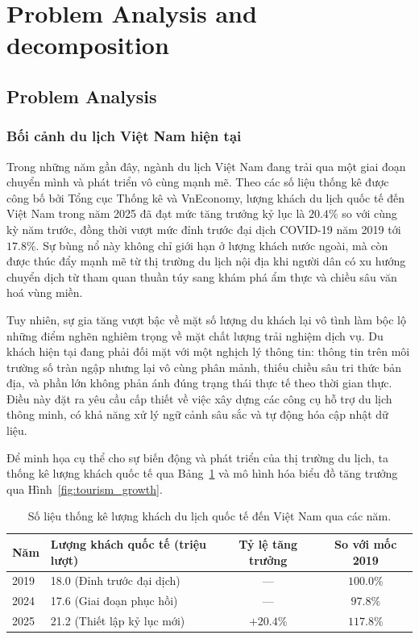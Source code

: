\section{Problem Analysis and decomposition}

\subsection{Problem Analysis}

\subsubsection{Bối cảnh du lịch Việt Nam hiện tại}

Trong những năm gần đây, ngành du lịch Việt Nam đang trải qua một giai đoạn chuyển mình và phát triển vô cùng mạnh mẽ. Theo các số liệu thống kê được công bố bởi Tổng cục Thống kê và VnEconomy, lượng khách du lịch quốc tế đến Việt Nam trong năm 2025 đã đạt mức tăng trưởng kỷ lục là $20.4\%$ so với cùng kỳ năm trước, đồng thời vượt mức đỉnh trước đại dịch COVID-19 năm 2019 tới $17.8\%$. Sự bùng nổ này không chỉ giới hạn ở lượng khách nước ngoài, mà còn được thúc đẩy mạnh mẽ từ thị trường du lịch nội địa khi người dân có xu hướng chuyển dịch từ tham quan thuần túy sang khám phá ẩm thực và chiều sâu văn hoá vùng miền.

Tuy nhiên, sự gia tăng vượt bậc về mặt số lượng du khách lại vô tình làm bộc lộ những điểm nghẽn nghiêm trọng về mặt chất lượng trải nghiệm dịch vụ. Du khách hiện tại đang phải đối mặt với một nghịch lý thông tin: thông tin trên môi trường số tràn ngập nhưng lại vô cùng phân mảnh, thiếu chiều sâu tri thức bản địa, và phần lớn không phản ánh đúng trạng thái thực tế theo thời gian thực. Điều này đặt ra yêu cầu cấp thiết về việc xây dựng các công cụ hỗ trợ du lịch thông minh, có khả năng xử lý ngữ cảnh sâu sắc và tự động hóa cập nhật dữ liệu.

Để minh họa cụ thể cho sự biến động và phát triển của thị trường du lịch, ta thống kê lượng khách quốc tế qua Bảng~\ref{tab:tourism_stats} và mô hình hóa biểu đồ tăng trưởng qua Hình~\ref{fig:tourism_growth}.

\begin{table}[H]
\centering
\begin{tabularx}{\textwidth}{l X c c}
\toprule
\textbf{Năm} & \textbf{Lượng khách quốc tế (triệu lượt)} & \textbf{Tỷ lệ tăng trưởng} & \textbf{So với mốc 2019} \\
\midrule
2019 & 18.0 (Đỉnh trước đại dịch) & --- & $100.0\%$ \\
2024 & 17.6 (Giai đoạn phục hồi) & --- & $97.8\%$ \\
2025 & 21.2 (Thiết lập kỷ lục mới) & $+20.4\%$ & $117.8\%$ \\
\bottomrule
\end{tabularx}
\caption{Số liệu thống kê lượng khách du lịch quốc tế đến Việt Nam qua các năm.}
\label{tab:tourism_stats}
\end{table}

